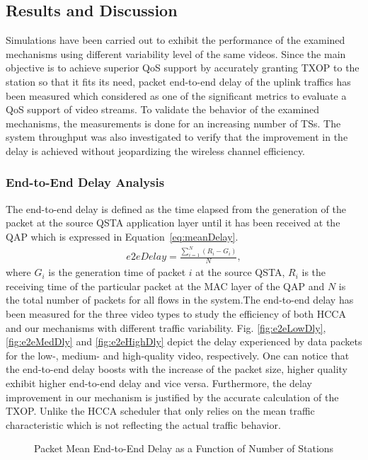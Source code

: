 \documentclass[a4paper, conference]{IEEEtran}
\begin{document}
\subsection{Results and Discussion}
Simulations have been carried out to exhibit the performance of the examined mechanisms using different variability level of the same videos. Since the main objective is to achieve superior QoS support by accurately granting TXOP to the station so that it fits its need, packet end-to-end delay of the uplink traffics has been measured which considered as one of the significant metrics to evaluate a QoS support of video streams. To validate the behavior of the examined mechanisms, the measurements is done for an increasing number of TSs. The system throughput was also investigated to verify that the improvement in the delay is achieved without jeopardizing the wireless channel efficiency.

\subsubsection{End-to-End Delay Analysis}
The end-to-end delay is defined as the time elapsed from the generation of the packet at the source QSTA application layer until it has been received at the QAP which is expressed in Equation~\eqref{eq:meanDelay}.
\begin{eqnarray}
\label{eq:meanDelay}
e2eDelay  = \frac { \sum_{i=1}^{N} ( R_{i}-G_{i})  } {N},
\end{eqnarray}
where $G_{i}$ is the generation time of packet $i$ at the source QSTA, $R_{i}$ is the receiving time of the particular packet at the MAC layer of the QAP and $N$ is the total number of packets for all flows in the system.The end-to-end delay has been measured for the three video types to study the efficiency of  both HCCA and our mechanisms with different traffic variability. Fig. \ref{fig:e2eLowDly}, \ref{fig:e2eMedDly} and \ref{fig:e2eHighDly} depict the delay experienced by data packets for the low-, medium- and high-quality video, respectively. One can notice that the end-to-end delay boosts with the increase of the packet size, higher quality exhibit higher end-to-end delay and vice versa. Furthermore, the delay improvement in our mechanism is justified by the accurate calculation of the TXOP. Unlike the HCCA scheduler that only relies on the mean traffic characteristic which is not reflecting the actual traffic behavior.
\begin{figure}[t]
\centering
{}
\caption{Packet Mean End-to-End Delay as a Function of Number of Stations}
\label{fig:accessDly}
\end{figure}
\end{document}
